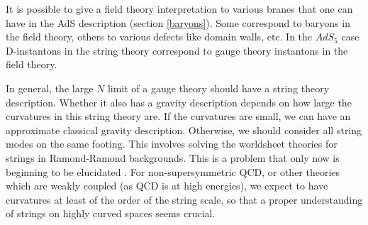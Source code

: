 It is possible to give a field theory 
interpretation to various branes that one 
can have in the AdS description (section \ref{baryons}).
 Some correspond to baryons in the 
field theory, others to various defects like domain walls, etc. 
In the $AdS_5$ case D-instantons in the string theory correspond 
to gauge theory instantons in the field theory. 

In general, the large $N$ limit of a gauge theory should have 
a string theory
description. Whether it also has a gravity description depends on how
large the curvatures in this string theory
are. If the curvatures are small, we can 
have an approximate classical gravity description. 
Otherwise, we should consider all string 
modes on the same footing. This involves solving the worldsheet
theories for strings in 
Ramond-Ramond backgrounds. This is a problem that only now is beginning
to be elucidated \cite{Berkovits:1999im,Metsaev:1998it,%
Pesando:1998fv,Kallosh:1998nx,Kallosh:1998ji,Polyakov:1998pm,%
Dolan:1999pi,Rajaraman:1999rc,Berenstein:1999jq}.
For non-supersymmetric QCD, or other theories which are weakly coupled
(as QCD is at high energies), we expect to 
have curvatures at least
of the order of the string scale, so that a proper understanding of
strings on highly curved spaces seems crucial. 

